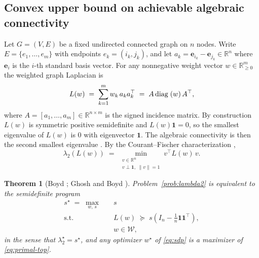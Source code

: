 \documentclass[letterpaper, 11 pt, journal, twoside]{IEEEtran}
\newcommand{\diag}{{\rm diag\;}}
\newcommand{\R}{\mathbb{R}}
\newtheorem{theorem}{Theorem}
\begin{document}
\subsection{Convex upper bound on achievable algebraic connectivity}
\label{sec:sdp}
Let $G = (V, E)$ be a fixed undirected connected graph on $n$ nodes.
Write $E = \{e_1, \ldots, e_m\}$ with endpoints
$e_k = (i_k, j_k)$, and let
$a_k = \mathbf{e}_{i_k} - \mathbf{e}_{j_k} \in \R^n$ where
$\mathbf{e}_i$ is the $i$-th standard basis vector. For any
nonnegative weight vector $w \in \R^m_{\ge 0}$ the weighted graph
Laplacian is
\begin{equation}
L(w) \;=\; \sum_{k=1}^{m} w_k\, a_k a_k^\top
\;=\; A\,\diag(w)\,A^\top,
\label{eq:Lw}
\end{equation}
where $A = [a_1, \ldots, a_m] \in \R^{n \times m}$ is the signed
incidence matrix. By construction $L(w)$ is symmetric positive
semidefinite and $L(w)\mathbf{1} = 0$, so the smallest eigenvalue of
$L(w)$ is $0$ with eigenvector $\mathbf{1}$. The algebraic
connectivity is then the second smallest eigenvalue
\cite{Fiedler1973,OlfatiSaber2007}. By the Courant--Fischer
characterization \cite{HornJohnson2013},
\begin{equation}
\lambda_2(L(w)) \;=\; \min_{\substack{v \in \R^n \\ v \perp \mathbf{1},\; \|v\|=1}} v^\top L(w)\, v.
\label{eq:rayleigh}
\end{equation}

\begin{theorem}[Boyd \cite{Boyd2006}; Ghosh and Boyd \cite{GhoshBoyd2006}]
\label{thm:fdla}
Problem~\ref{prob:lambda2} is equivalent to the semidefinite program
\begin{equation}
\begin{aligned}
s^\star \;=\; \max_{w,\,s} \quad & s \\
\text{s.t.} \quad & L(w) \;\succeq\; s\!\left(I_n - \tfrac{1}{n}\mathbf{1}\mathbf{1}^\top\right), \\
& w \in \mathcal{W},
\end{aligned}
\label{eq:sdp}
\end{equation}
in the sense that $\lambda_2^\star = s^\star$, and any optimizer
$w^\star$ of \eqref{eq:sdp} is a maximizer of \eqref{eq:primal-top}.
\end{theorem}
\end{document}
